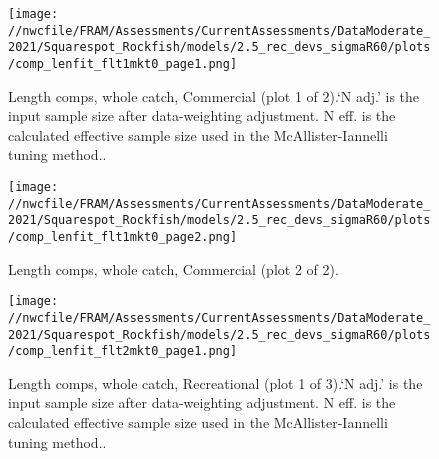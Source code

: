 \documentclass[11pt,
  english,
  a4paper,
]{article}
\begin{document}
\leavevmode\tagmcend\tagstructend


\begin{figure}
\centering
\texttt{[image: //nwcfile/FRAM/Assessments/CurrentAssessments/DataModerate\_2021/Squarespot\_Rockfish/models/2.5\_rec\_devs\_sigmaR60/plots/comp\_lenfit\_flt1mkt0\_page1.png]}
\caption{Length comps, whole catch, Commercial (plot 1 of 2).`N adj.' is the input sample size after data-weighting adjustment. N eff. is the calculated effective sample size used in the McAllister-Iannelli tuning method..\label{fig:comp_lenfit_flt1mkt0_page1}}
\end{figure}

\tagmcend\tagstructend


\begin{figure}
\centering
\texttt{[image: //nwcfile/FRAM/Assessments/CurrentAssessments/DataModerate\_2021/Squarespot\_Rockfish/models/2.5\_rec\_devs\_sigmaR60/plots/comp\_lenfit\_flt1mkt0\_page2.png]}
\caption{Length comps, whole catch, Commercial (plot 2 of 2).\label{fig:comp_lenfit_flt1mkt0_page2}}
\end{figure}

\tagmcend\tagstructend


\begin{figure}
\centering
\texttt{[image: //nwcfile/FRAM/Assessments/CurrentAssessments/DataModerate\_2021/Squarespot\_Rockfish/models/2.5\_rec\_devs\_sigmaR60/plots/comp\_lenfit\_flt2mkt0\_page1.png]}
\caption{Length comps, whole catch, Recreational (plot 1 of 3).`N adj.' is the input sample size after data-weighting adjustment. N eff. is the calculated effective sample size used in the McAllister-Iannelli tuning method..\label{fig:comp_lenfit_flt2mkt0_page1}}
\end{figure}
\end{document}
